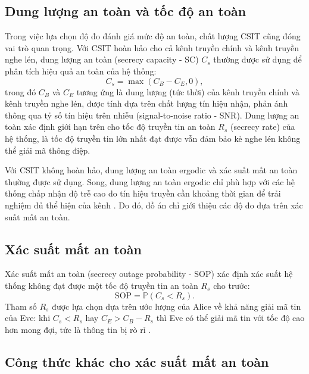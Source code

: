 \documentclass[../main.tex]{subfiles}
\begin{document}
\subsection{Dung lượng an toàn và tốc độ an toàn}

Trong việc lựa chọn độ đo đánh giá mức độ an toàn, chất lượng CSIT cũng đóng vai trò quan trọng. Với CSIT hoàn hảo cho cả kênh truyền chính và kênh truyền nghe lén, dung lượng an toàn (secrecy capacity - SC) $C_s$ \cite{barros2006secrecy} thường được sử dụng để phân tích hiệu quả an toàn của hệ thống:
\begin{equation}\label{metric:cs}
    C_s = \max\left(C_B - C_E, 0\right),
\end{equation}
trong đó $C_B$ và $C_E$ tương ứng là dung lượng (tức thời) của kênh truyền chính và kênh truyền nghe lén, được tính dựa trên chất lượng tín hiệu nhận, phản ánh thông qua tỷ số tín hiệu trên nhiễu (signal-to-noise ratio - SNR). Dung lượng an toàn xác định giới hạn trên cho tốc độ truyền tin an toàn $R_s$ (secrecy rate) của hệ thống, là tốc độ truyền tin lớn nhất đạt được vẫn đảm bảo kẻ nghe lén không thể giải mã thông điệp.

Với CSIT không hoàn hảo, dung lượng an toàn ergodic \cite{gopala2008secrecy,rezki2011ergodic} và xác suất mất an toàn \cite{parada2005secrecy,barros2006secrecy} thường được sử dụng. Song, dung lượng an toàn ergodic chỉ phù hợp với các hệ thống chấp nhận độ trễ cao do tín hiệu truyền cần khoảng thời gian để trải nghiệm đủ thể hiện của kênh \cite{he2013wireless}. Do đó, đồ án chỉ giới thiệu các độ đo dựa trên xác suất mất an toàn.

\subsection{Xác suất mất an toàn}

Xác suất mất an toàn (secrecy outage probability - SOP) xác định xác suất hệ thống không đạt được một tốc độ truyền tin an toàn $R_s$ cho trước:
\begin{equation}\label{sop}
    \text{SOP} = \mathbb{P}\left(C_s < R_s\right).
\end{equation}
Tham số $R_s$ được lựa chọn dựa trên ước lượng của Alice về khả năng giải mã tin của Eve: khi $C_s < R_s$ hay $C_E > C_B - R_s$ thì Eve có thể giải mã tin với tốc độ cao hơn mong đợi, tức là thông tin bị rò rỉ \cite{barros2006secrecy}.

\subsection{Công thức khác cho xác suất mất an toàn}
\end{document}
